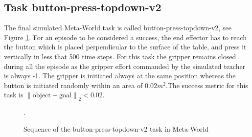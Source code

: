 \subsection{Task button-press-topdown-v2}
\label{subsection:metaworld-button-press-topdown-v2}

The final simulated Meta-World task is called button-press-topdown-v2, see Figure \ref{fig:sequence-button}. For an episode to be considered a success, the end effector has to reach the button which is placed perpendicular to the surface of the table, and press it vertically in less that 500 time steps.
For this task the gripper remains closed during all the episode as the gripper effort commanded by the simulated teacher is always -1. The gripper is initiated always at the same position whereas the button is initiated randomly within an area of  $0.02m^2$.The success metric for this task is ${\left\lVert \text{object}-\text{goal} \right\rVert}_2 < 0.02$.

 \begin{figure}[H]
  \centering
  \hspace*{\fill}%
   \hfill
   \hfill
  \hspace*{\fill}%
  \caption{Sequence of the button-press-topdown-v2 task in Meta-World}.
  \label{fig:sequence-button}
\end{figure}


